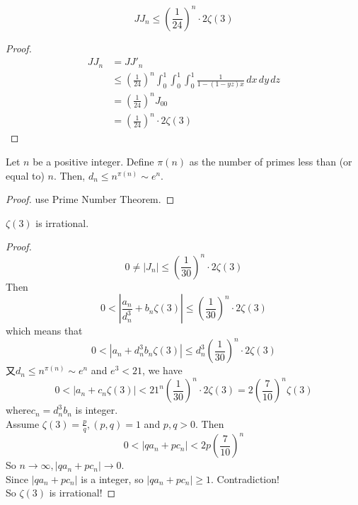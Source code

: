 \begin{theorem}\label{JJ_upper}
    \[ JJ_n \leqslant (\frac{1}{24})^n\cdot 2\zeta(3) \]
\end{theorem}
\begin{proof}
    \begin{align*}
        JJ_n &= JJ'_n \\
        &\leqslant (\frac{1}{24})^n \int_{0}^{1}\int_{0}^{1}\int_{0}^{1} \frac{1}{1-(1-yz)x} \, dx \, dy \, dz \\
        &= (\frac{1}{24})^n J_{00} \\
        &= (\frac{1}{24})^n \cdot 2\zeta(3)
    \end{align*}
\end{proof}

\begin{lemma}\label{dn_asymptotic}
    Let $n$ be a positive integer. Define $\pi(n)$ as the number of primes less than (or equal to) $n$. Then, $d_n \leqslant n^{\pi(n)} \sim e^n$.
\end{lemma}
\begin{proof}
    use Prime Number Theorem. 
\end{proof}

\begin{theorem}\label{zeta_3_irrational}
    $\zeta(3)$ is irrational.
\end{theorem}
\begin{proof}
    \leanok
    \[ 0 \neq |J_n| \leqslant (\frac{1}{30})^n\cdot 2\zeta(3) \]
    Then 
    \[ 0 < |\frac{a_n}{d_n^3} + b_n\zeta(3)| \leqslant (\frac{1}{30})^n\cdot 2\zeta(3) \]
    which means that 
    \[ 0 < |a_n + d_n^3 b_n\zeta(3)| \leqslant d_n^3(\frac{1}{30})^n\cdot 2\zeta(3) \] 
    又$d_n \leqslant n^{\pi(n)} \sim e^n$ and $e^3 < 21$, we have
    \[ 0 < |a_n + c_n\zeta(3)| < 21^n (\frac{1}{30})^n\cdot 2\zeta(3) = 2(\frac{7}{10})^n \zeta(3) \]
    where$c_n = d_n^3 b_n$ is integer.\\
    Assume $\zeta(3) = \frac{p}{q}, (p,q)=1$ and $p,q>0$. Then 
    \[ 0 < |qa_n + pc_n| < 2p (\frac{7}{10})^n \]
    So $n \rightarrow \infty, |qa_n + pc_n| \rightarrow 0$.\\
    Since $|qa_n + pc_n|$ is a integer, so $|qa_n + pc_n| \geqslant 1$. Contradiction! \\
    So $\zeta(3)$ is irrational!
\end{proof}
